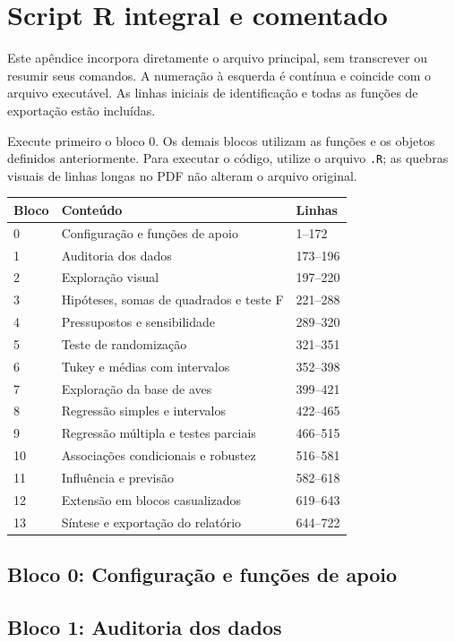 \chapter{Script R integral e comentado}\label{ap:script}
Este apêndice incorpora diretamente o arquivo principal, sem transcrever ou resumir seus comandos. A numeração à esquerda é contínua e coincide com o arquivo executável. As linhas iniciais de identificação e todas as funções de exportação estão incluídas.
\begin{atencao}Execute primeiro o bloco 0. Os demais blocos utilizam as funções e os objetos definidos anteriormente. Para executar o código, utilize o arquivo \texttt{.R}; as quebras visuais de linhas longas no PDF não alteram o arquivo original.\end{atencao}
\begin{longtable}{p{.12\linewidth}p{.60\linewidth}p{.18\linewidth}}
\toprule Bloco & Conteúdo & Linhas\\\midrule\endhead
0 & Configuração e funções de apoio & 1--172\\
1 & Auditoria dos dados & 173--196\\
2 & Exploração visual & 197--220\\
3 & Hipóteses, somas de quadrados e teste F & 221--288\\
4 & Pressupostos e sensibilidade & 289--320\\
5 & Teste de randomização & 321--351\\
6 & Tukey e médias com intervalos & 352--398\\
7 & Exploração da base de aves & 399--421\\
8 & Regressão simples e intervalos & 422--465\\
9 & Regressão múltipla e testes parciais & 466--515\\
10 & Associações condicionais e robustez & 516--581\\
11 & Influência e previsão & 582--618\\
12 & Extensão em blocos casualizados & 619--643\\
13 & Síntese e exportação do relatório & 644--722\\
\bottomrule\end{longtable}
\clearpage
\section{Bloco 0: Configuração e funções de apoio}
\label{cod:bloco0}
\section{Bloco 1: Auditoria dos dados}
\label{cod:bloco1}
